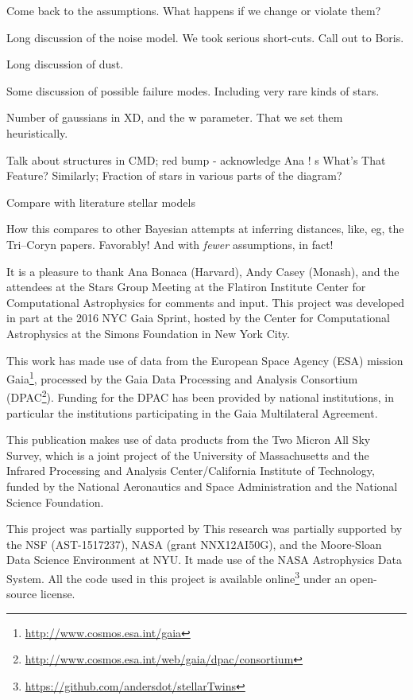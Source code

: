 \documentclass[modern]{aastex61}
\newcommand{\acronym}[1]{{\small{#1}}}
\newcommand{\xd}{\acronym{XD}}
\begin{document}
Come back to the assumptions. What happens if we change or violate them?

Long discussion of the noise model. We took serious short-cuts. Call out to Boris.

Long discussion of dust.

Some discussion of possible failure modes. Including very rare kinds of stars.

Number of gaussians in \xd, and the w parameter. That we set them heuristically.

Talk about structures in CMD; red bump - acknowledge Ana ! s
What's That Feature? Similarly; Fraction of stars in various parts of the diagram?

Compare with literature stellar models

How this compares to other Bayesian attempts at inferring distances,
like, eg, the Tri--Coryn papers. Favorably! And with \emph{fewer}
assumptions, in fact!

\acknowledgments It is a pleasure to thank
  Ana Bonaca (Harvard),
  Andy Casey (Monash),
and the attendees at the Stars Group Meeting at the Flatiron Institute
Center for Computational Astrophysics for comments and input.
This project was developed in part at the 2016 \acronym{NYC} Gaia Sprint, hosted
by the Center for Computational Astrophysics at the Simons Foundation
in New York City.

This work has made use of data from the European Space Agency (\acronym{ESA})
mission Gaia\footnote{\url{http://www.cosmos.esa.int/gaia}}, processed by the Gaia
Data Processing and Analysis Consortium (\acronym{DPAC}\footnote{\url{http://www.cosmos.esa.int/web/gaia/dpac/consortium}}). Funding for the
\acronym{DPAC} has been provided by national institutions, in particular the
institutions participating in the Gaia Multilateral Agreement.

This publication makes use of data products from the Two Micron All
Sky Survey, which is a joint project of the
University of Massachusetts and the Infrared Processing and Analysis
Center/California Institute of Technology, funded by the National
Aeronautics and Space Administration and the National Science
Foundation.

This project was partially supported by This research was partially supported by
  the \acronym{NSF} (\acronym{AST-1517237}),
  \acronym{NASA} (grant \acronym{NNX12AI50G}),
  and the Moore-Sloan Data Science Environment at \acronym{NYU}.
It made use of the \acronym{NASA} Astrophysics Data System.
All the code used in this project is available online\footnote{\url{https://github.com/andersdot/stellarTwins}} under an open-source license.




\clearpage
\end{document}
